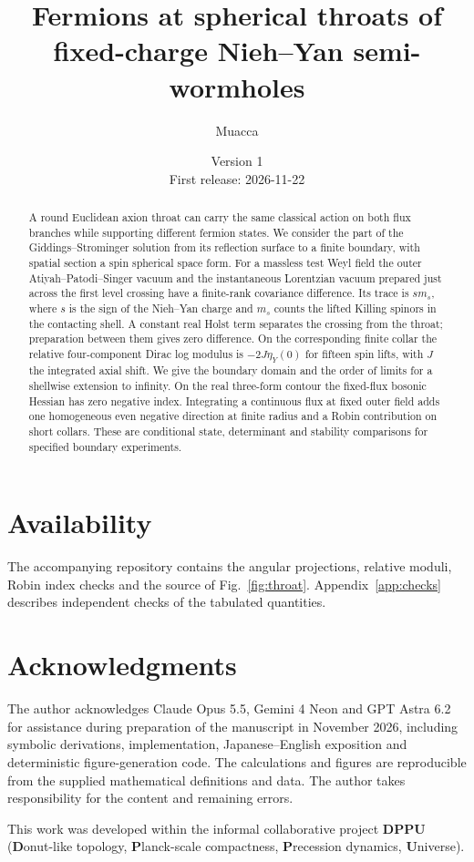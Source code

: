 \documentclass[11pt,a4paper]{article}
\title{Fermions at spherical throats of fixed-charge Nieh--Yan semi-wormholes}
\author{Muacca}
\date{Version 1\\First release: 2026-11-22}
\begin{document}
\maketitle
\begin{abstract}
A round Euclidean axion throat can carry the same classical action on both flux branches while supporting different fermion states. We consider the part of the Giddings--Strominger solution from its reflection surface to a finite boundary, with spatial section a spin spherical space form. For a massless test Weyl field the outer Atiyah--Patodi--Singer vacuum and the instantaneous Lorentzian vacuum prepared just across the first level crossing have a finite-rank covariance difference. Its trace is $s m_s$, where $s$ is the sign of the Nieh--Yan charge and $m_s$ counts the lifted Killing spinors in the contacting shell. A constant real Holst term separates the crossing from the throat; preparation between them gives zero difference. On the corresponding finite collar the relative four-component Dirac log modulus is $-2J\eta_Y(0)$ for fifteen spin lifts, with $J$ the integrated axial shift. We give the boundary domain and the order of limits for a shellwise extension to infinity. On the real three-form contour the fixed-flux bosonic Hessian has zero negative index. Integrating a continuous flux at fixed outer field adds one homogeneous even negative direction at finite radius and a Robin contribution on short collars. These are conditional state, determinant and stability comparisons for specified boundary experiments.
\end{abstract}
\begingroup\small\tableofcontents\endgroup







\section*{Availability}
The accompanying repository contains the angular projections, relative moduli, Robin index checks and the source of Fig.~\ref{fig:throat}. Appendix~\ref{app:checks} describes independent checks of the tabulated quantities.
\section*{Acknowledgments}
The author acknowledges Claude Opus 5.5, Gemini 4 Neon and GPT Astra 6.2 for assistance during preparation of the manuscript in November 2026, including symbolic derivations, implementation, Japanese--English exposition and deterministic figure-generation code. The calculations and figures are reproducible from the supplied mathematical definitions and data. The author takes responsibility for the content and remaining errors.

This work was developed within the informal collaborative project \textbf{DPPU} (\textbf{D}onut-like topology, \textbf{P}lanck-scale compactness, \textbf{P}recession dynamics, \textbf{U}niverse).
\appendix







\end{document}
